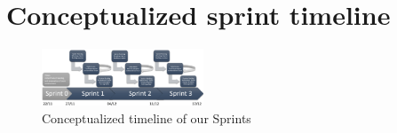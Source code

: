 \section{Conceptualized sprint timeline}
\label{sec:sprint-timeline}

\begin{figure}[htb]
\centering
    \includegraphics[angle=90, width=0.43\textwidth]{Appendices/graphics/sprinttimeline.png}
    \caption{Conceptualized timeline of our Sprints}
    \label{fig:sprintfig}
\end{figure}
